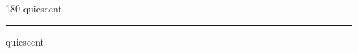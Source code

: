 
\begin{frame}
\begin{center}
\begin{turn}{180}
{\fontsize{2.5cm}{1em}\selectfont quiescent}
\end{turn}
\vspace{1em}\par  
\hrule
\vspace{1em}\par  
{\fontsize{2.5cm}{1em}\selectfont quiescent}
\end{center}
\end{frame}
